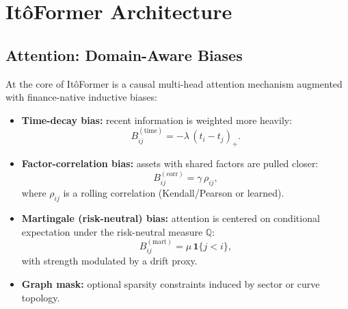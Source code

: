 \documentclass[10pt,twocolumn]{article}
\begin{document}
\section{It\^oFormer Architecture}

\subsection{Attention: Domain-Aware Biases}

At the core of It\^oFormer is a causal multi-head attention mechanism augmented with 
finance-native inductive biases:

\begin{itemize}
    \item \textbf{Time-decay bias:} recent information is weighted more heavily:
    \[
    B^{(\text{time})}_{ij} = -\lambda \,(t_i - t_j)_{+}.
    \]

    \item \textbf{Factor-correlation bias:} assets with shared factors are pulled closer:
    \[
    B^{(\text{corr})}_{ij} = \gamma \,\rho_{ij},
    \]
    where $\rho_{ij}$ is a rolling correlation (Kendall/Pearson or learned).

    \item \textbf{Martingale (risk-neutral) bias:} attention is centered on conditional expectation 
    under the risk-neutral measure $\mathbb Q$:
    \[
    B^{(\text{mart})}_{ij} = \mu \,\mathbf 1\{ j < i \},
    \]
    with strength modulated by a drift proxy.

    \item \textbf{Graph mask:} optional sparsity constraints induced by sector or curve topology.
\end{itemize}
\end{document}
